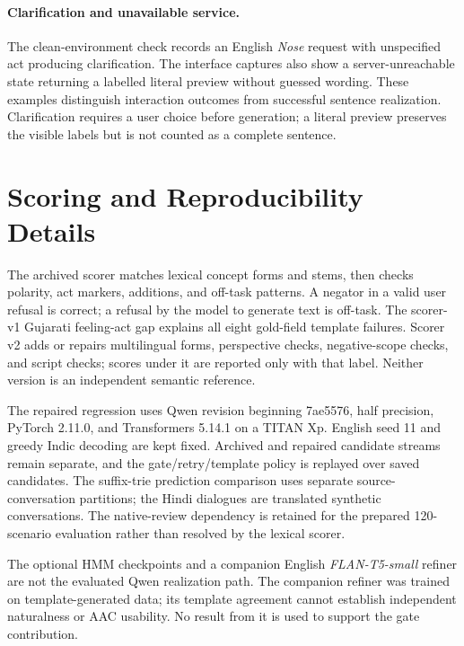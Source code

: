 \paragraph{Clarification and unavailable service.}
The clean-environment check records an English \emph{Nose} request with unspecified act producing clarification.
The interface captures also show a server-unreachable state returning a labelled literal preview without guessed wording.
These examples distinguish interaction outcomes from successful sentence realization.
Clarification requires a user choice before generation; a literal preview preserves the visible labels but is not counted as a complete sentence.

\section{Scoring and Reproducibility Details}
\label{app:scorer}
The archived scorer matches lexical concept forms and stems, then checks polarity, act markers, additions, and off-task patterns.
A negator in a valid user refusal is correct; a refusal by the model to generate text is off-task.
The scorer-v1 Gujarati feeling-act gap explains all eight gold-field template failures.
Scorer v2 adds or repairs multilingual forms, perspective checks, negative-scope checks, and script checks; scores under it are reported only with that label.
Neither version is an independent semantic reference.

The repaired regression uses Qwen revision beginning 7ae5576, half precision, PyTorch 2.11.0, and Transformers 5.14.1 on a TITAN Xp.
English seed 11 and greedy Indic decoding are kept fixed.
Archived and repaired candidate streams remain separate, and the gate/retry/template policy is replayed over saved candidates.
The suffix-trie prediction comparison uses separate source-conversation partitions; the Hindi dialogues are translated synthetic conversations.
The native-review dependency is retained for the prepared 120-scenario evaluation rather than resolved by the lexical scorer.

\balance
The optional HMM checkpoints and a companion English \emph{FLAN-T5-small} refiner are not the evaluated Qwen realization path.
The companion refiner was trained on template-generated data; its template agreement cannot establish independent naturalness or AAC usability.
No result from it is used to support the gate contribution.

